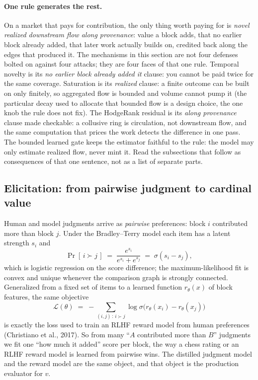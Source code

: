 \documentclass[10pt]{article}
\begin{document}
\paragraph{One rule generates the rest.} On a market that pays for contribution, the only thing worth
paying for is \emph{novel realized downstream flow along provenance}: value a block adds, that no
earlier block already added, that later work actually builds on, credited back along the edges that
produced it. The mechanisms in this section are not four defenses bolted on against four attacks; they
are four faces of that one rule. Temporal novelty is its \emph{no earlier block already added it}
clause: you cannot be paid twice for the same coverage. Saturation is its \emph{realized} clause: a
finite outcome can be built on only finitely, so aggregated flow is bounded and volume cannot pump it
(the particular decay used to allocate that bounded flow is a design choice, the one knob the rule does
not fix). The HodgeRank residual is its \emph{along provenance} clause made checkable: a collusive ring
is circulation, not downstream flow, and the same computation that prices the work detects the
difference in one pass. The bounded learned gate keeps the estimator faithful to the rule: the model may
only estimate realized flow, never mint it. Read the subsections that follow as consequences of that one
sentence, not as a list of separate parts.

\subsection{Elicitation: from pairwise judgment to cardinal value}

Human and model judgments arrive as \emph{pairwise} preferences: block $i$ contributed more than block
$j$. Under the Bradley--Terry model each item has a latent strength $s_i$ and
\begin{equation}
\Pr[\,i \succ j\,] \;=\; \frac{e^{s_i}}{e^{s_i}+e^{s_j}} \;=\; \sigma(s_i - s_j),
\end{equation}
which is logistic regression on the score difference; the maximum-likelihood fit is convex and unique
whenever the comparison graph is strongly connected. Generalized from a fixed set of items to a learned
function $r_\theta(x)$ of block features, the same objective
\begin{equation}
\mathcal{L}(\theta) \;=\; -\!\!\sum_{(i,j)\,:\,i\succ j} \log \sigma\big(r_\theta(x_i) - r_\theta(x_j)\big)
\end{equation}
is exactly the loss used to train an RLHF reward model from human preferences (Christiano et al., 2017).
So from many ``$A$ contributed more than $B$''
judgments we fit one ``how much it added'' score per block, the way a chess rating or an RLHF reward
model is learned from pairwise wins. The distilled judgment model and the reward model are the same
object, and that object is the production evaluator for $v$.
\end{document}
